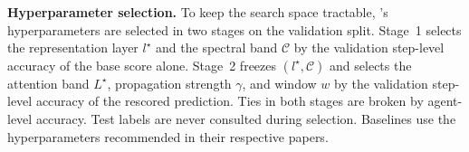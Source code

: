 \textbf{Hyperparameter selection.}
To keep the search space tractable, \soap{}'s hyperparameters are selected in two stages on the validation split. Stage~1 selects the representation layer $l^\star$ and the spectral band $\mathcal{C}$ by the validation step-level accuracy of the base score alone. Stage~2 freezes $(l^\star, \mathcal{C})$ and selects the attention band $L^\star$, propagation strength $\gamma$, and window $w$ by the validation step-level accuracy of the rescored prediction. Ties in both stages are broken by agent-level accuracy. Test labels are never consulted during selection. Baselines use the hyperparameters recommended in their respective papers.





